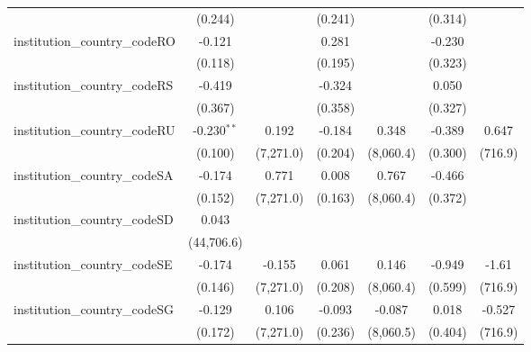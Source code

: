 \begin{tabular}{lcccccc}
                                         & (0.244)        &               & (0.241)        &                & (0.314)        &   \\   
   institution\_country\_codeRO          & -0.121         &               & 0.281          &                & -0.230         &   \\   
                                         & (0.118)        &               & (0.195)        &                & (0.323)        &   \\   
   institution\_country\_codeRS          & -0.419         &               & -0.324         &                & 0.050          &   \\   
                                         & (0.367)        &               & (0.358)        &                & (0.327)        &   \\   
   institution\_country\_codeRU          & -0.230$^{**}$  & 0.192         & -0.184         & 0.348          & -0.389         & 0.647\\   
                                         & (0.100)        & (7,271.0)     & (0.204)        & (8,060.4)      & (0.300)        & (716.9)\\   
   institution\_country\_codeSA          & -0.174         & 0.771         & 0.008          & 0.767          & -0.466         &   \\   
                                         & (0.152)        & (7,271.0)     & (0.163)        & (8,060.4)      & (0.372)        &   \\   
   institution\_country\_codeSD          & 0.043          &               &                &                &                &   \\   
                                         & (44,706.6)     &               &                &                &                &   \\   
   institution\_country\_codeSE          & -0.174         & -0.155        & 0.061          & 0.146          & -0.949         & -1.61\\   
                                         & (0.146)        & (7,271.0)     & (0.208)        & (8,060.4)      & (0.599)        & (716.9)\\   
   institution\_country\_codeSG          & -0.129         & 0.106         & -0.093         & -0.087         & 0.018          & -0.527\\   
                                         & (0.172)        & (7,271.0)     & (0.236)        & (8,060.5)      & (0.404)        & (716.9)\\   

\end{tabular}
